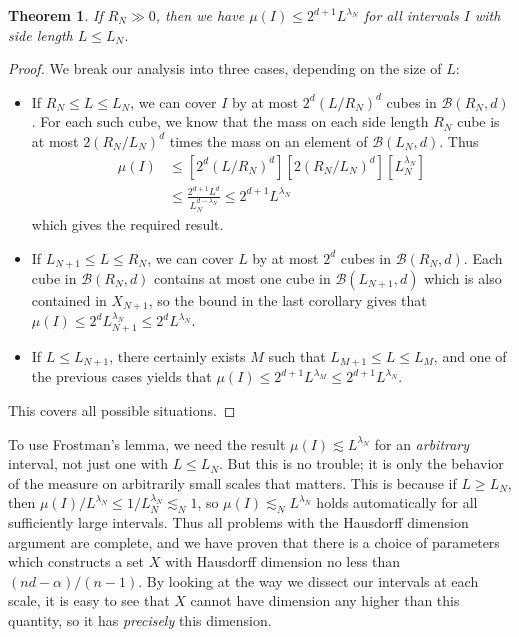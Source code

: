 \documentclass{article}
\theoremstyle{plain}
\theoremstyle{plain}
\newtheorem{theorem}{Theorem}
\begin{document}
\begin{theorem}
	If $R_N \gg 0$, then we have $\mu(I) \leq 2^{d+1} L^{\lambda_N}$ for all intervals $I$ with side length $L \leq L_N$.
\end{theorem}
\begin{proof}
	We break our analysis into three cases, depending on the size of $L$:
	\begin{itemize}
		\item If $R_N \leq L \leq L_N$, we can cover $I$ by at most $2^d(L/R_N)^d$ cubes in $\mathcal{B}(R_N,d)$. For each such cube, we know that the mass on each side length $R_N$ cube is at most $2(R_N/L_N)^d$ times the mass on an element of $\mathcal{B}(L_N,d)$. Thus
		\begin{align*}
			\mu(I) &\leq [2^d(L/R_N)^d] [2(R_N/L_N)^d] [L_N^{\lambda_N}]\\
			&\leq \frac{2^{d+1} L^d}{L_N^{d - \lambda_N}} \leq 2^{d+1} L^{\lambda_N}
		\end{align*}
		which gives the required result.

		\item If $L_{N+1} \leq L \leq R_N$, we can cover $L$ by at most $2^d$ cubes in $\mathcal{B}(R_N,d)$. Each cube in $\mathcal{B}(R_N,d)$ contains at most one cube in $\mathcal{B}(L_{N+1},d)$ which is also contained in $X_{N+1}$, so the bound in the last corollary gives that $\mu(I) \leq 2^d L_{N+1}^{\lambda_N} \leq 2^d L^{\lambda_N}$.

		\item If $L \leq L_{N+1}$, there certainly exists $M$ such that $L_{M+1} \leq L \leq L_M$, and one of the previous cases yields that $\mu(I) \leq 2^{d+1} L^{\lambda_M} \leq 2^{d+1} L^{\lambda_N}$.
	\end{itemize}
	This covers all possible situations.
\end{proof}

To use Frostman's lemma, we need the result $\mu(I) \lesssim L^{\lambda_N}$ for an {\it arbitrary} interval, not just one with $L \leq L_N$. But this is no trouble; it is only the behavior of the measure on arbitrarily small scales that matters. This is because if $L \geq L_N$, then $\mu(I)/L^{\lambda_N} \leq 1/L_N^{\lambda_N} \lesssim_N 1$, so $\mu(I) \lesssim_N L^{\lambda_N}$ holds automatically for all sufficiently large intervals. Thus all problems with the Hausdorff dimension argument are complete, and we have proven that there is a choice of parameters which constructs a set $X$ with Hausdorff dimension no less than $(nd - \alpha)/(n-1)$. By looking at the way we dissect our intervals at each scale, it is easy to see that $X$ cannot have dimension any higher than this quantity, so it has {\it precisely} this dimension.
\end{document}
